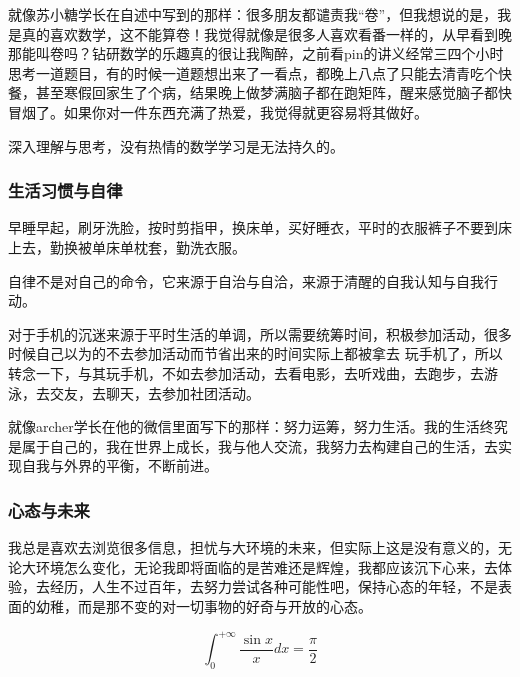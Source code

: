 \documentclass[12pt, a4paper, oneside]{ctexart}
\begin{document}
就像苏小糖学长在自述中写到的那样：很多朋友都谴责我“卷”，但我想说的是，我是真的喜欢数学，这不能算卷！我觉得就像是很多人喜欢看番一样的，从早看到晚那能叫卷吗？钻研数学的乐趣真的很让我陶醉，之前看pin的讲义经常三四个小时思考一道题目，有的时候一道题想出来了一看点，都晚上八点了只能去清青吃个快餐，甚至寒假回家生了个病，结果晚上做梦满脑子都在跑矩阵，醒来感觉脑子都快冒烟了。如果你对一件东西充满了热爱，我觉得就更容易将其做好。

深入理解与思考，没有热情的数学学习是无法持久的。

\subsubsection{生活习惯与自律}

早睡早起，刷牙洗脸，按时剪指甲，换床单，买好睡衣，平时的衣服裤子不要到床上去，勤换被单床单枕套，勤洗衣服。

自律不是对自己的命令，它来源于自治与自洽，来源于清醒的自我认知与自我行动。

对于手机的沉迷来源于平时生活的单调，所以需要统筹时间，积极参加活动，很多时候自己以为的不去参加活动而节省出来的时间实际上都被拿去
玩手机了，所以转念一下，与其玩手机，不如去参加活动，去看电影，去听戏曲，去跑步，去游泳，去交友，去聊天，去参加社团活动。

就像archer学长在他的微信里面写下的那样：努力运筹，努力生活。我的生活终究是属于自己的，我在世界上成长，我与他人交流，我努力去构建自己的生活，去实现自我与外界的平衡，不断前进。

\subsubsection{心态与未来}

我总是喜欢去浏览很多信息，担忧与大环境的未来，但实际上这是没有意义的，无论大环境怎么变化，无论我即将面临的是苦难还是辉煌，我都应该沉下心来，去体验，去经历，人生不过百年，去努力尝试各种可能性吧，保持心态的年轻，不是表面的幼稚，而是那不变的对一切事物的好奇与开放的心态。



$$\int_{0}^{+\infty}\frac{\sin x}{x}dx=\frac{\pi}{2}$$
\end{document}
